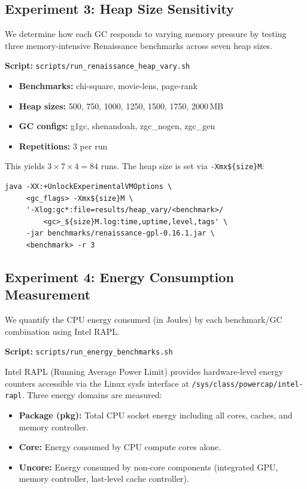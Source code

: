 \subsection{Experiment 3: Heap Size Sensitivity}

We determine how each GC responds to varying memory pressure by testing three memory-intensive Renaissance benchmarks across seven heap sizes.

\textbf{Script:} \texttt{scripts/run\_renaissance\_heap\_vary.sh}

\begin{itemize}
\item \textbf{Benchmarks:} chi-square, movie-lens, page-rank
\item \textbf{Heap sizes:} 500, 750, 1000, 1250, 1500, 1750, 2000\,MB
\item \textbf{GC configs:} g1gc, shenandoah, zgc\_nogen, zgc\_gen
\item \textbf{Repetitions:} 3 per run
\end{itemize}

This yields $3 \times 7 \times 4 = 84$ runs. The heap size is set via \texttt{-Xmx\$\{size\}M}:

\begin{verbatim}
java -XX:+UnlockExperimentalVMOptions \
     <gc_flags> -Xmx${size}M \
     '-Xlog:gc*:file=results/heap_vary/<benchmark>/
         <gc>_${size}M.log:time,uptime,level,tags' \
     -jar benchmarks/renaissance-gpl-0.16.1.jar \
     <benchmark> -r 3
\end{verbatim}


\subsection{Experiment 4: Energy Consumption Measurement}

We quantify the CPU energy consumed (in Joules) by each benchmark/GC combination using Intel RAPL.

\textbf{Script:} \texttt{scripts/run\_energy\_benchmarks.sh}

Intel RAPL (Running Average Power Limit) provides hardware-level energy counters accessible via the Linux sysfs interface at \texttt{/sys/class/powercap/intel-rapl}. Three energy domains are measured:
\begin{itemize}
\item \textbf{Package (pkg):} Total CPU socket energy including all cores, caches, and memory controller.
\item \textbf{Core:} Energy consumed by CPU compute cores alone.
\item \textbf{Uncore:} Energy consumed by non-core components (integrated GPU, memory controller, last-level cache controller).
\end{itemize}

